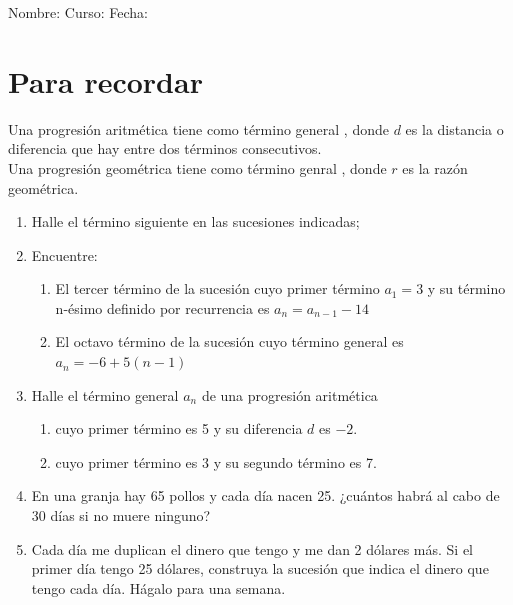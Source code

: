 \documentclass[fleqn]{article}
\newcommand{\LineaNombre}{%
\par
\vspace{\baselineskip}
Nombre:\hrulefill \; Curso: \underline{\hspace*{48pt}} \; Fecha: \underline{\hspace*{2.5cm}} \relax
\par}
\begin{document}
\LineaNombre
\section*{Para recordar}
Una progresi\'on aritmética tiene como término general , donde $d$ es la distancia o diferencia que hay entre dos términos consecutivos.\\

Una progresión geométrica tiene como término genral ,
donde $r$ es la razón geométrica.
\begin{enumerate}
\item Halle el término siguiente en las sucesiones indicadas;
  \begin{enumerate}
\end{enumerate}
\item Encuentre:
\begin{enumerate}
\item El tercer término de la sucesión cuyo primer término $a_1=3$ y su término n-ésimo definido por recurrencia es $a_n=a_{n-1}-14$  \noanswer[.75in]
\item El octavo término de la sucesión cuyo término general es $a_n=-6+5(n-1)$ \noanswer[.75in]
\end{enumerate}
\newpage
\item Halle el término general $a_{n}$ de una progresión aritmética
\begin{enumerate}
\item cuyo primer término es 5 y su diferencia $d$ es $-2$. \noanswer
\item cuyo primer término es 3 y su segundo término es 7.\noanswer
\end{enumerate}
\item En una granja hay 65 pollos y cada día nacen 25. ¿cuántos habrá al cabo de 30 días si no muere ninguno?\noanswer
\item Cada día me duplican el dinero que tengo y me dan 2 dólares más. Si el primer día tengo 25 dólares, construya la sucesión que indica el dinero que tengo cada día. Hágalo para una semana.\noanswer
\end{enumerate}
\end{document}
